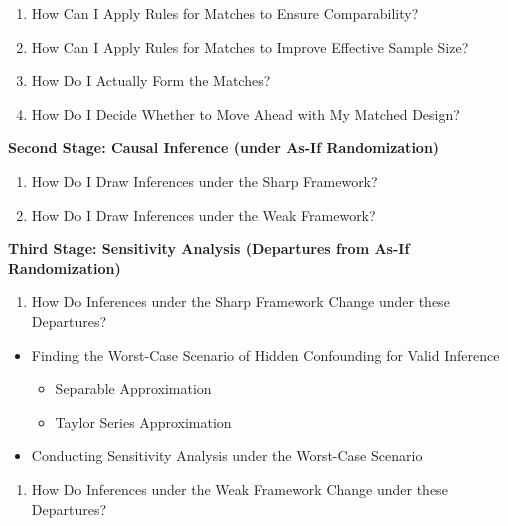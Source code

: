 \documentclass[
  12pt,
  leqno]{article}
\providecommand{\tightlist}{%
  \setlength{\itemsep}{0pt}\setlength{\parskip}{0pt}}
\def\tightlist{}
\begin{document}
\begin{enumerate}
\def\labelenumi{(\alph{enumi})}
\setcounter{enumi}{1}
\item
  How Can I Apply Rules for Matches to Ensure Comparability?
\item
  How Can I Apply Rules for Matches to Improve Effective Sample Size?
\item
  How Do I Actually Form the Matches?
\item
  How Do I Decide Whether to Move Ahead with My Matched Design?
\end{enumerate}

\textbf{Second Stage: Causal Inference (under As-If Randomization)}

\begin{enumerate}
\def\labelenumi{(\alph{enumi})}
\item
  How Do I Draw Inferences under the Sharp Framework?
\item
  How Do I Draw Inferences under the Weak Framework?
\end{enumerate}

\textbf{Third Stage: Sensitivity Analysis (Departures from As-If
Randomization)}

\begin{enumerate}
\def\labelenumi{(\alph{enumi})}
\tightlist
\item
  How Do Inferences under the Sharp Framework Change under these
  Departures?
\end{enumerate}

\begin{itemize}
\item
  Finding the Worst-Case Scenario of Hidden Confounding for Valid
  Inference

  \begin{itemize}
  \tightlist
  \item
    Separable Approximation
  \item
    Taylor Series Approximation
  \end{itemize}
\item
  Conducting Sensitivity Analysis under the Worst-Case Scenario
\end{itemize}

\begin{enumerate}
\def\labelenumi{(\alph{enumi})}
\setcounter{enumi}{1}
\tightlist
\item
  How Do Inferences under the Weak Framework Change under these
  Departures?
\end{enumerate}
\end{document}
